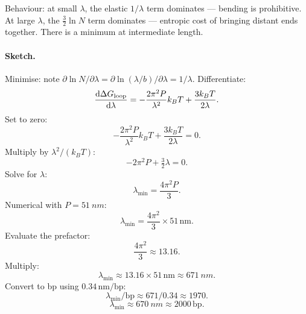 \documentclass[11pt]{article}
\begin{document}
Behaviour: at small $\lambda$, the elastic $1/\lambda$ term dominates --- bending is prohibitive. At large $\lambda$, the $\tfrac32\ln N$ term dominates --- entropic cost of bringing distant ends together. There is a minimum at intermediate length.

\paragraph{Sketch.}
\begin{center}
\end{center}

Minimise: note $\partial\ln N/\partial\lambda = \partial\ln(\lambda/b)/\partial\lambda = 1/\lambda$. Differentiate:
\[ \dv{\Delta G_\text{loop}}{\lambda} = -\frac{2\pi^2 P}{\lambda^2}k_B T + \frac{3 k_B T}{2\lambda}. \]
Set to zero:
\[ -\frac{2\pi^2 P}{\lambda^2}k_B T + \frac{3 k_B T}{2\lambda} = 0. \]
Multiply by $\lambda^2/(k_BT)$:
\[ -2\pi^2 P + \tfrac32 \lambda = 0. \]
Solve for $\lambda$:
\[ \lambda_\text{min} = \frac{4\pi^2 P}{3}. \]
Numerical with $P=\SI{51}{nm}$:
\[ \lambda_\text{min} = \frac{4\pi^2}{3}\times 51\,\text{nm}. \]
Evaluate the prefactor:
\[ \frac{4\pi^2}{3} \approx 13.16. \]
Multiply:
\[ \lambda_\text{min} \approx 13.16 \times 51\,\text{nm} \approx \SI{671}{nm}. \]
Convert to bp using $0.34\,\text{nm/bp}$:
\[ \lambda_\text{min}/\text{bp} \approx 671/0.34 \approx 1970. \]
\[ \boxed{\;\lambda_\text{min} \approx \SI{670}{nm} \approx 2000\,\text{bp}.\;} \]
\end{document}

